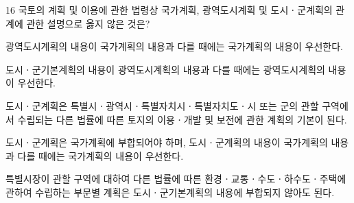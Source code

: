 \begin{question}{16}
국토의 계획 및 이용에 관한 법령상 국가계획, 광역도시계획 및 도시ㆍ군계획의 관계에 관한 설명으로 옳지 않은 것은?
\begin{choices}
  \item 광역도시계획의 내용이 국가계획의 내용과 다를 때에는 국가계획의 내용이 우선한다.
  \item 도시ㆍ군기본계획의 내용이 광역도시계획의 내용과 다를 때에는 광역도시계획의 내용이 우선한다.
  \item 도시ㆍ군계획은 특별시ㆍ광역시ㆍ특별자치시ㆍ특별자치도ㆍ시 또는 군의 관할 구역에서 수립되는 다른 법률에 따른 토지의 이용ㆍ개발 및 보전에 관한 계획의 기본이 된다.
  \item 도시ㆍ군계획은 국가계획에 부합되어야 하며, 도시ㆍ군계획의 내용이 국가계획의 내용과 다를 때에는 국가계획의 내용이 우선한다.
  \item 특별시장이 관할 구역에 대하여 다른 법률에 따른 환경ㆍ교통ㆍ수도ㆍ하수도ㆍ주택에 관하여 수립하는 부문별 계획은 도시ㆍ군기본계획의 내용에 부합되지 않아도 된다.
\end{choices}
\end{question}
